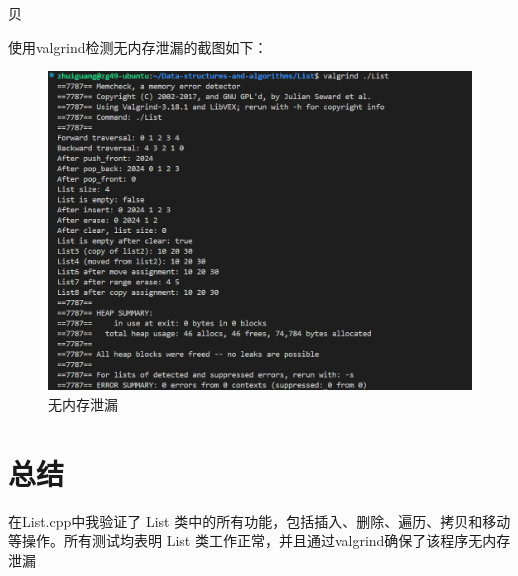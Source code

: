 贝\documentclass[UTF8]{ctexart}
\begin{document}
使用valgrind检测无内存泄漏的截图如下：
\begin{figure}[H]
    \centering
    \includegraphics[width=1\linewidth]{内存无泄漏.png}
    \caption{无内存泄漏}
    \label{fig:enter-label}
\end{figure}

\section{总结}

在List.cpp中我验证了 List 类中的所有功能，包括插入、删除、遍历、拷贝和移动等操作。所有测试均表明 List 类工作正常，并且通过valgrind确保了该程序无内存泄漏
\end{document}
